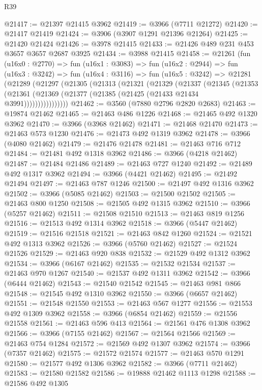 \begin{lexlean}{R39}
\begin{coremodule}
@21417 := @21397 @21415 @3962
@21419 := @3966 (@7711 @21272)
@21420 := @21417 @21419
@21424 := @3906 (@3907 @1291 @21396 @21264)
@21425 := @21420 @21424
@21426 := @3978 @21415
@21433 := @21426 @489 @231 @453 @3657 @3657 @2687 @3925
@21434 := @3988 @21415
@21458 := @21261
    (fun (u16x0 : @2770) =>
    fun (u16x1 : @3083) =>
    fun (u16x2 : @2944) =>
    fun (u16x3 : @3242) =>
    fun (u16x4 : @3116) =>
    fun (u16x5 : @3242) =>
    @21281
      (@21289
        (@21297
          (@21305
            (@21313
              (@21321
                (@21329
                  (@21337
                    (@21345
                      (@21353
                        (@21361 (@21369 (@21377 (@21385 (@21425 (@21433 @21434 @3991))))))))))))))))
@21462 := @3560 (@7880 @2796 @2820 @2683)
@21463 := @19874 @21462
@21465 := @21463 @486 @1226
@21468 := @21465 @492 @1320 @3962
@21470 := @3966 (@3968 @21462)
@21471 := @21468 @21470
@21473 := @21463 @573 @1230
@21476 := @21473 @492 @1319 @3962
@21478 := @3966 (@4080 @21462)
@21479 := @21476 @21478
@21481 := @21463 @716 @712
@21484 := @21481 @492 @1318 @3962
@21486 := @3966 (@4218 @21462)
@21487 := @21484 @21486
@21489 := @21463 @727 @1240
@21492 := @21489 @492 @1317 @3962
@21494 := @3966 (@4421 @21462)
@21495 := @21492 @21494
@21497 := @21463 @787 @1246
@21500 := @21497 @492 @1316 @3962
@21502 := @3966 (@5085 @21462)
@21503 := @21500 @21502
@21505 := @21463 @800 @1250
@21508 := @21505 @492 @1315 @3962
@21510 := @3966 (@5257 @21462)
@21511 := @21508 @21510
@21513 := @21463 @819 @1256
@21516 := @21513 @492 @1314 @3962
@21518 := @3966 (@5447 @21462)
@21519 := @21516 @21518
@21521 := @21463 @842 @1260
@21524 := @21521 @492 @1313 @3962
@21526 := @3966 (@5760 @21462)
@21527 := @21524 @21526
@21529 := @21463 @920 @838
@21532 := @21529 @492 @1312 @3962
@21534 := @3966 (@6167 @21462)
@21535 := @21532 @21534
@21537 := @21463 @970 @1267
@21540 := @21537 @492 @1311 @3962
@21542 := @3966 (@6444 @21462)
@21543 := @21540 @21542
@21545 := @21463 @981 @866
@21548 := @21545 @492 @1310 @3962
@21550 := @3966 (@6657 @21462)
@21551 := @21548 @21550
@21553 := @21463 @567 @1277
@21556 := @21553 @492 @1309 @3962
@21558 := @3966 (@6854 @21462)
@21559 := @21556 @21558
@21561 := @21463 @596 @413
@21564 := @21561 @476 @1308 @3962
@21566 := @3966 (@7155 @21462)
@21567 := @21564 @21566
@21569 := @21463 @754 @1284
@21572 := @21569 @492 @1307 @3962
@21574 := @3966 (@7357 @21462)
@21575 := @21572 @21574
@21577 := @21463 @570 @1291
@21580 := @21577 @492 @1306 @3962
@21582 := @3966 (@7711 @21462)
@21583 := @21580 @21582
@21586 := @19888 @21462 @1113 @1298
@21588 := @21586 @492 @1305

\end{coremodule}
\end{lexlean}
